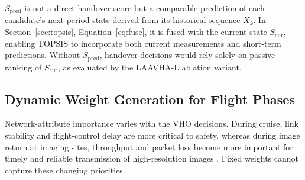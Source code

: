 \documentclass[final,3p,times,twocolumn]{elsarticle}
\begin{document}
$S_{\mathrm{pred}}$ is not a direct handover score but a comparable prediction of each candidate's next-period state derived from its historical sequence $X_k$. In Section~\ref{sec:topsis}, Equation~\eqref{eq:fuse}, it is fused with the current state $S_{\mathrm{cur}}$, enabling TOPSIS to incorporate both current measurements and short-term predictions. Without $S_{\mathrm{pred}}$, handover decisions would rely solely on passive ranking of $S_{\mathrm{cur}}$, as evaluated by the LAAVHA-L ablation variant.

\subsection{Dynamic Weight Generation for Flight Phases}\label{sec:weight}

Network-attribute importance varies with the VHO decisions. During cruise, link stability and flight-control delay are more critical to safety, whereas during image return at imaging sites, throughput and packet loss become more important for timely and reliable transmission of high-resolution images \cite{ref25}. Fixed weights cannot capture these changing priorities.
\end{document}
